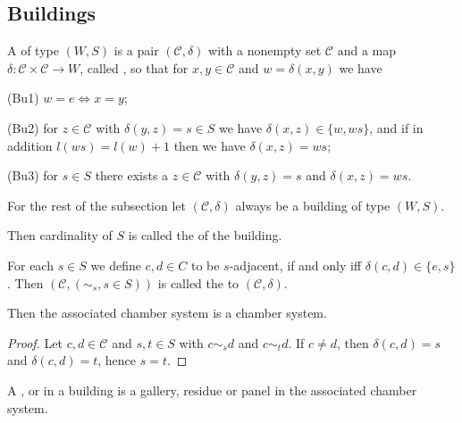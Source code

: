 \subsection{Buildings}

\begin{defi}
	A  of type $(W,S)$ is a pair $(\mathcal{C}, \delta)$ with a nonempty set $\mathcal{C}$ and a map $\delta : \mathcal{C} \times \mathcal{C} \to W$, called , so that for $x,y \in \mathcal C$ and $w = \delta(x,y)$ we have
	\begin{axioms}
		\item[(Bu1)] $w = e \iff x = y$;
		\item[(Bu2)] for $z \in \mathcal C$ with $\delta(y,z) = s \in S$ we have $\delta(x,z) \in \{w,ws\}$, and if in addition $l(ws) = l(w) + 1$ then we have $\delta(x,z) = ws$;
		\item[(Bu3)] for $s \in S$ there exists a $z \in \mathcal C$ with $\delta(y,z) = s$ and $\delta(x,z) = ws$.
	\end{axioms}
\end{defi}

For the rest of the subsection let $(\mathcal{C}, \delta)$ always be a building of type $(W,S)$.

\begin{defi}
	Then cardinality of $S$ is called the  of the building.
\end{defi}

\begin{defi}
	For each $s \in S$ we define $c,d \in C$ to be $s$-adjacent, if and only iff $\delta(c,d) \in \{e,s\}$. Then $(\mathcal{C}, (\sim_s, s \in S))$ is called the  to $(\mathcal{C}, \delta)$.
\end{defi}

\begin{lemm}
	Then the associated chamber system is a chamber system.

	\begin{proof}
		Let $c,d \in \mathcal{C}$ and $s,t \in S$ with $c \sim_s d$ and $c \sim_t d$. If $c \neq d$, then $\delta(c,d) = s$ and $\delta(c,d) = t$, hence $s = t$.
	\end{proof}
\end{lemm}

\begin{defi}
	A ,  or  in a building is a gallery, residue or panel in the associated chamber system.
\end{defi}

